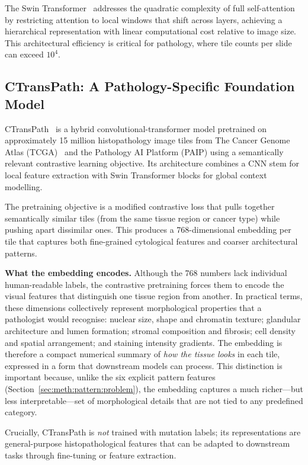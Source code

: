 The Swin Transformer~\cite{liu2021swin} addresses the quadratic complexity of full self-attention by restricting attention to local windows that shift across layers, achieving a hierarchical representation with linear computational cost relative to image size.
This architectural efficiency is critical for pathology, where tile counts per slide can exceed $10^4$.

\subsection{CTransPath: A Pathology-Specific Foundation Model}
\label{sec:bg:ctranspath}

CTransPath~\cite{wang2022ctranspath} is a hybrid convolutional-transformer model pretrained on approximately 15 million histopathology image tiles from The Cancer Genome Atlas (TCGA)~\cite{tcga2014luad} and the Pathology AI Platform (PAIP) using a semantically relevant contrastive learning objective.
Its architecture combines a CNN stem for local feature extraction with Swin Transformer blocks for global context modelling.

The pretraining objective is a modified contrastive loss that pulls together semantically similar tiles (from the same tissue region or cancer type) while pushing apart dissimilar ones.
This produces a 768-dimensional embedding per tile that captures both fine-grained cytological features and coarser architectural patterns.

\textbf{What the embedding encodes.}
Although the 768 numbers lack individual human-readable labels,
the contrastive pretraining forces them to encode the visual features
that distinguish one tissue region from another.
In practical terms, these dimensions collectively represent
morphological properties that a pathologist would recognise:
nuclear size, shape and chromatin texture;
glandular architecture and lumen formation;
stromal composition and fibrosis;
cell density and spatial arrangement;
and staining intensity gradients.
The embedding is therefore a compact numerical summary of
\emph{how the tissue looks} in each tile, expressed in a form that
downstream models can process.
This distinction is important because, unlike the six explicit pattern
features (Section~\ref{sec:meth:pattern:problem}), the embedding
captures a much richer---but less interpretable---set of
morphological details that are not tied to any predefined category.

Crucially, CTransPath is \emph{not} trained with mutation labels; its representations are general-purpose histopathological features that can be adapted to downstream tasks through fine-tuning or feature extraction.

